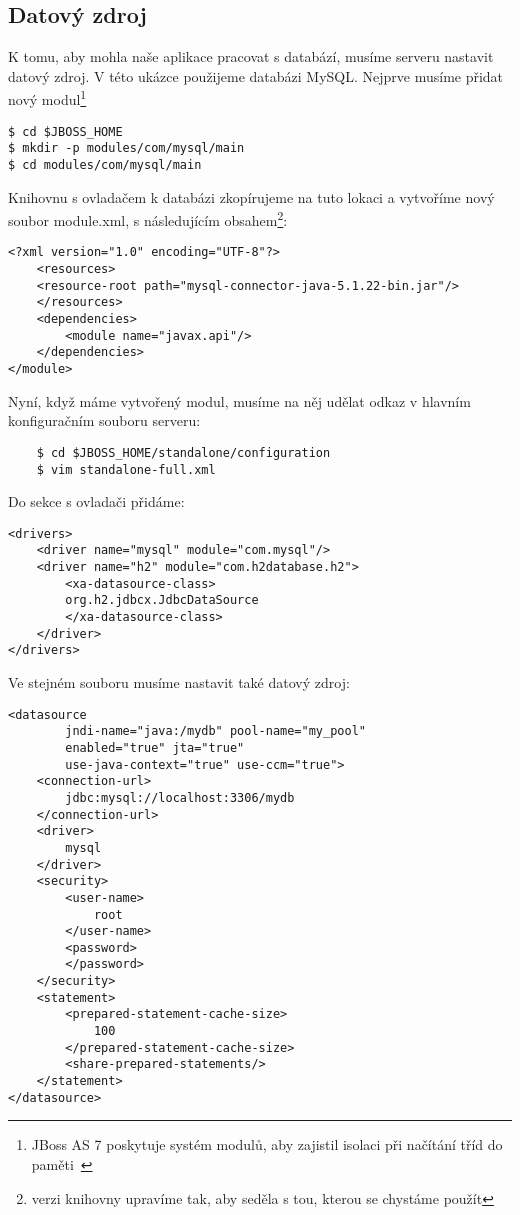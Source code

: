 \documentclass[122pt,oneside]{fithesis}
\begin{document}
\subsection{Datový zdroj}
K tomu, aby mohla naše aplikace pracovat s databází, musíme serveru nastavit datový zdroj. V této ukázce použijeme databázi MySQL.
Nejprve musíme přidat nový modul\footnote{JBoss AS 7 poskytuje systém modulů, aby zajistil isolaci při načítání tříd do paměti~\cite{datasource}}
\begin{lstlisting}
$ cd $JBOSS_HOME
$ mkdir -p modules/com/mysql/main
$ cd modules/com/mysql/main
\end{lstlisting}
Knihovnu s ovladačem k databázi zkopírujeme na tuto lokaci a vytvoříme nový soubor module.xml, s následujícím obsahem\footnote[1]{verzi knihovny upravíme tak, aby seděla s tou, kterou se chystáme použít}:
\begin{lstlisting}
<?xml version="1.0" encoding="UTF-8"?>
	<resources>
	<resource-root path="mysql-connector-java-5.1.22-bin.jar"/>
	</resources>
	<dependencies>
		<module name="javax.api"/>
	</dependencies>
</module>
\end{lstlisting}
Nyní, když máme vytvořený modul, musíme na něj udělat odkaz v hlavním konfiguračním souboru serveru:
\begin{lstlisting}
	$ cd $JBOSS_HOME/standalone/configuration
	$ vim standalone-full.xml
\end{lstlisting}
Do sekce s ovladači přidáme:
\begin{lstlisting}
<drivers>
	<driver name="mysql" module="com.mysql"/>
	<driver name="h2" module="com.h2database.h2">
        <xa-datasource-class>
		org.h2.jdbcx.JdbcDataSource
        </xa-datasource-class>
	</driver>
</drivers>
\end{lstlisting}
Ve stejném souboru musíme nastavit také datový zdroj:
\begin{lstlisting}
<datasource
        jndi-name="java:/mydb" pool-name="my_pool"
        enabled="true" jta="true"
        use-java-context="true" use-ccm="true">
    <connection-url>
        jdbc:mysql://localhost:3306/mydb
    </connection-url>
    <driver>
        mysql
    </driver>
    <security>
        <user-name>
            root
        </user-name>
        <password>
        </password>
    </security>
    <statement>
        <prepared-statement-cache-size>
            100
        </prepared-statement-cache-size>
        <share-prepared-statements/>
    </statement>
</datasource>
\end{lstlisting}
\end{document}
